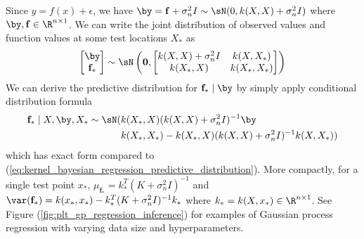 \documentclass[11pt]{article}
\renewcommand\bf{\ensuremath{\mathbf{f}}}
\begin{document}
Since $y=f(x)+\epsilon$, we have $\by = \bf + \sigma_n^2 I \sim \sN(0, k(X,X)+\sigma_n^2I)$ where $\by,\bf\in\R^{n\times 1}$. We can write the joint distribution of observed values and function values at some test locations $X_*$ as
\begin{align}
    \begin{bmatrix}
        \by \\ \bf_*
    \end{bmatrix}
    \sim
    \sN\left(
        \mathbf{0},
        \begin{bmatrix}
            k(X,X) + \sigma_n^2I & k(X,X_*) \\
            k(X_*,X) & k(X_*,X_*) \\ 
        \end{bmatrix}
    \right)
    \label{eq:gaussian_process_regression_noisy_model}
\end{align}
We can derive the predictive distribution for $\bf_*\mid \by$ by simply apply conditional distribution formula
\begin{align}
    \bf_* \mid X,\by, X_* \sim \sN(
        & k(X_*,X) (k(X,X)+\sigma_n^2 I)^{-1} \by  \\
        & k(X_*,X_*) - k(X_*,X) (k(X,X)+\sigma_n^2 I)^{-1} k(X,X_*) )
    \label{eq:gp_regression_predictive_distribution}
\end{align}
which has exact form compared to (\ref{eq:kernel_bayesian_regression_predictive_distribution}). More compactly, for a single test point $x_*$, $\mu_{\bf_*} =  k_*^T (K+\sigma_n^2 I)^{-1}$ and $\var(\bf_*) = k(x_*,x_*) - k_*^T (K+\sigma_n^2 I)^{-1} k_* $ where $k_* = k(X,x_*)\in \R^{n\times 1}$. See Figure (\ref{fig:plt_gp_regression_inference}) for examples of Gaussian process regression with varying data size and hyperparameters. 
\end{document}
